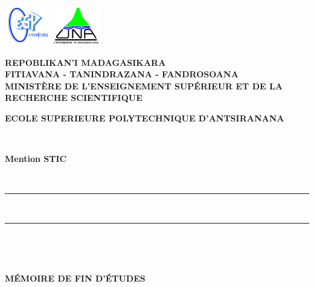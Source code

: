 \documentclass[12pt,a4paper]{report}
\begin{document}
	
 \begin{titlepage}
 	\includegraphics[width=0.15\textwidth]{logo_espa}
 	\hfill \includegraphics[width=0.15\textwidth]{logo_una}\\
 	\parbox{9cm}{
 		\begin{center}
 			\vspace*{-30 mm}\large\textbf{REPOBLIKAN'I MADAGASIKARA}\\
 			\small\textbf{FITIAVANA - TANINDRAZANA - FANDROSOANA}\\
 			\vspace*{0.2 cm}
 			\normalsize\textbf{MINISTÈRE DE L'ENSEIGNEMENT SUPÉRIEUR ET DE LA RECHERCHE SCIENTIFIQUE}\\
 		\end{center}
 	}
 	\centering
 	\parbox{\textwidth}{
 		\begin{center}
 			\vspace*{4 mm} 
 			\normalsize\large\textbf{ECOLE SUPERIEURE POLYTECHNIQUE D'ANTSIRANANA}
 		\end{center}
 	}
 	\\
 	\centering\parbox{\textwidth}{
 		\begin{center}
 			\large\textbf{Mention STIC} 
 		\end{center}			
 	}
 	\\
 	\centering\parbox{\textwidth}{
 		\begin{center}
 			\color{black}\rule{\textwidth}{1.5pt}\\
 			\vspace*{-0.42 cm}
 			\rule{\textwidth}{0.5pt}\\
 		\end{center}			
 	}\\
 	\vspace*{-0.7 cm}
 	\centering\parbox{\textwidth}{
 		\begin{center}
 			\begin{normalsize}
 				\color{black} 
 				\textbf{MÉMOIRE DE FIN D'ÉTUDES}
 			\end{normalsize}

\end{center}}
\end{titlepage}
\end{document}
